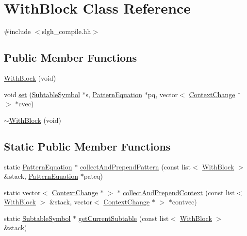 \hypertarget{class_with_block}{}\section{With\+Block Class Reference}
\label{class_with_block}


{\ttfamily \#include $<$slgh\+\_\+compile.\+hh$>$}

\subsection*{Public Member Functions}
\begin{DoxyCompactItemize}
\item 
\mbox{\hyperlink{class_with_block_a5067a3be282b8884e0bbad283cec72a7}{With\+Block}} (void)
\item 
void \mbox{\hyperlink{class_with_block_ac1f6e37b3b4a73dec01977574cad4847}{set}} (\mbox{\hyperlink{class_subtable_symbol}{Subtable\+Symbol}} $\ast$s, \mbox{\hyperlink{class_pattern_equation}{Pattern\+Equation}} $\ast$pq, vector$<$ \mbox{\hyperlink{class_context_change}{Context\+Change}} $\ast$ $>$ $\ast$cvec)
\item 
\mbox{\hyperlink{class_with_block_abe10370cfebc01730b24138bc86b6f54}{$\sim$\+With\+Block}} (void)
\end{DoxyCompactItemize}
\subsection*{Static Public Member Functions}
\begin{DoxyCompactItemize}
\item 
static \mbox{\hyperlink{class_pattern_equation}{Pattern\+Equation}} $\ast$ \mbox{\hyperlink{class_with_block_a700a2814e4ba5491e74fe73822ed8901}{collect\+And\+Prepend\+Pattern}} (const list$<$ \mbox{\hyperlink{class_with_block}{With\+Block}} $>$ \&stack, \mbox{\hyperlink{class_pattern_equation}{Pattern\+Equation}} $\ast$pateq)
\item 
static vector$<$ \mbox{\hyperlink{class_context_change}{Context\+Change}} $\ast$ $>$ $\ast$ \mbox{\hyperlink{class_with_block_a76f78948cc2b5489881a43fdc92158bd}{collect\+And\+Prepend\+Context}} (const list$<$ \mbox{\hyperlink{class_with_block}{With\+Block}} $>$ \&stack, vector$<$ \mbox{\hyperlink{class_context_change}{Context\+Change}} $\ast$ $>$ $\ast$contvec)
\item 
static \mbox{\hyperlink{class_subtable_symbol}{Subtable\+Symbol}} $\ast$ \mbox{\hyperlink{class_with_block_a1b7aa928d0295023c7e8835f4a39ef02}{get\+Current\+Subtable}} (const list$<$ \mbox{\hyperlink{class_with_block}{With\+Block}} $>$ \&stack)
\end{DoxyCompactItemize}


